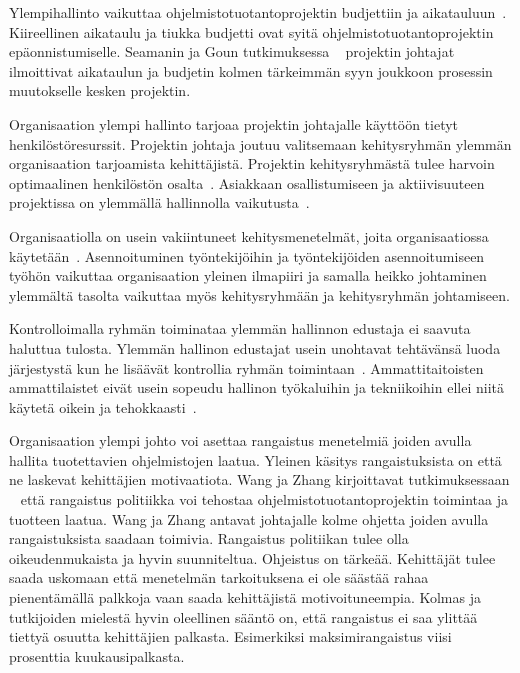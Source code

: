 \documentclass[finnish]{tktltiki2}
\theoremstyle{definition}
\theoremstyle{remark}
\begin{document}
Ylempihallinto vaikuttaa ohjelmistotuotantoprojektin budjettiin ja aikatauluun~\cite{McLeod:2011:FAS:1978802.1978803}. Kiireellinen aikataulu ja tiukka budjetti ovat syitä ohjelmistotuotantoprojektin epäonnistumiselle. Seamanin ja Goun tutkimuksessa ~\cite{Guo:2008:SSP:1414004.1414046} projektin johtajat ilmoittivat aikataulun ja budjetin kolmen tärkeimmän syyn joukkoon prosessin muutokselle kesken projektin.

Organisaation ylempi hallinto tarjoaa projektin johtajalle käyttöön tietyt henkilöstöresurssit. Projektin johtaja joutuu valitsemaan kehitysryhmän ylemmän organisaation tarjoamista kehittäjistä. Projektin kehitysryhmästä tulee harvoin optimaalinen henkilöstön osalta~\cite{Dhomne:2012:ITL:2382887.2382899}. Asiakkaan osallistumiseen ja aktiivisuuteen projektissa on ylemmällä hallinnolla vaikutusta~\cite{McLeod:2011:FAS:1978802.1978803}.

Organisaatiolla on usein vakiintuneet kehitysmenetelmät, joita organisaatiossa käytetään~\cite{McLeod:2011:FAS:1978802.1978803}. Asennoituminen työntekijöihin ja työntekijöiden asennoitumiseen työhön vaikuttaa organisaation yleinen ilmapiiri ja samalla heikko johtaminen ylemmältä tasolta vaikuttaa myös kehitysryhmään ja kehitysryhmän johtamiseen.

Kontrolloimalla ryhmän toiminataa ylemmän hallinnon edustaja ei saavuta haluttua tulosta. Ylemmän hallinon edustajat usein unohtavat tehtävänsä luoda järjestystä kun he lisäävät kontrollia ryhmän toimintaan~\cite{Augustine:2005:APM:1101779.1101781}. Ammattitaitoisten ammattilaistet eivät usein sopeudu hallinon työkaluihin ja tekniikoihin ellei niitä käytetä oikein ja tehokkaasti~\cite{Augustine:2005:APM:1101779.1101781}.   

Organisaation ylempi johto voi asettaa rangaistus menetelmiä joiden avulla hallita tuotettavien ohjelmistojen laatua. Yleinen käsitys rangaistuksista on että ne laskevat kehittäjien motivaatiota. Wang ja Zhang kirjoittavat tutkimuksessaan ~\cite{Wang:2010:PPP:1810295.1810302} että rangaistus politiikka voi tehostaa ohjelmistotuotantoprojektin toimintaa ja tuotteen laatua. Wang ja Zhang antavat johtajalle kolme ohjetta joiden avulla rangaistuksista saadaan toimivia. Rangaistus politiikan tulee olla oikeudenmukaista ja hyvin suunniteltua. Ohjeistus on tärkeää. Kehittäjät tulee saada uskomaan että menetelmän tarkoituksena ei ole säästää rahaa pienentämällä palkkoja vaan saada kehittäjistä motivoituneempia. Kolmas ja tutkijoiden mielestä hyvin oleellinen sääntö on, että rangaistus ei saa ylittää tiettyä osuutta kehittäjien palkasta. Esimerkiksi maksimirangaistus viisi prosenttia kuukausipalkasta.
\end{document}
